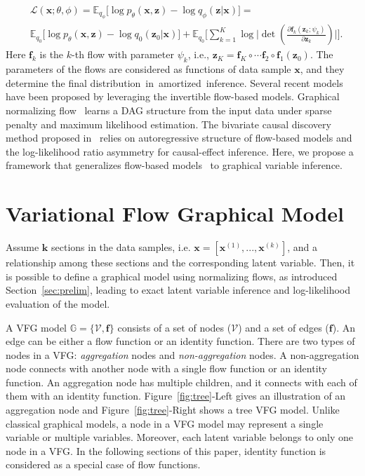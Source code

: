 \documentclass[sigconf, anonymous, review]{acmart}
\theoremstyle{plain}
\theoremstyle{definition}
\theoremstyle{remark}
\begin{document}
\begin{align*}%
&\mathcal{L}(\mathbf{x}; \theta, \phi)  =  \mathbb{E}_{q_{\phi}} \big[\log p_{\theta}(\mathbf{x},\mathbf{z})-\log q_{\phi}(\mathbf{z}|\mathbf{x}) \big] = \\ & \mathbb{E}_{q_{0}} \big[\log p_{\theta}(\mathbf{x},\mathbf{z}) - \log q_{0}(\mathbf{z}_0|\mathbf{x}) \big] + \mathbb{E}_{q_{0}} \big[\sum_{k=1}^K \log\big|\det(\frac{\partial \mathbf{f}_k( \mathbf{z}_k; \psi_k)}{\partial \mathbf{z}_k}) \big| \big].
\end{align*}%
Here $\mathbf{f}_k$ is the $k$-th flow with parameter $\psi_k$, i.e., $\mathbf{z}_K = \mathbf{f}_K \circ \cdots  \mathbf{f}_2 \circ  \mathbf{f}_1(\mathbf{z}_0)$. The parameters of the flows are considered as functions of data sample $\mathbf{x}$, and they determine the final distribution~in~amortized~inference.
Several recent models have been proposed by leveraging the invertible  flow-based models. Graphical normalizing flow~\cite{wehenkel2021graphical}  learns a DAG structure from the input data under  sparse penalty and maximum likelihood estimation. 
The bivariate causal discovery method proposed in~\cite{khemakhem2021causal} relies on  autoregressive structure of flow-based models and the  log-likelihood ratio asymmetry for causal-effect inference. Here, we propose a framework that generalizes flow-based models~\cite{Dinh2016DensityEU, dinh2014nice,rezende2015variational,berg2018sylvester} to graphical variable inference.


\section{Variational Flow Graphical Model}\label{sec:tech}

Assume $\mathbf{k}$ sections in the data samples, i.e. $\mathbf{x} = [\mathbf{x}^{(1)}, ..., \mathbf{x}^{(k)}]$, and  a relationship among these sections and the corresponding  latent variable.
Then, it is possible to define a graphical model using normalizing flows, as introduced Section~\ref{sec:prelim}, leading to exact latent variable inference and log-likelihood evaluation of the model. 


A VFG model  $\mathbb{G}=\{\mathcal{V}, \mathbf{f}\} $ consists of a set of nodes ($\mathcal{V}$) and a set of edges ($\mathbf{f}$). An edge can be either a flow function or an identity function. There are two types of nodes in a VFG: \emph{aggregation} nodes and \emph{non-aggregation} nodes. 
A non-aggregation node connects with another node with a single flow function or an identity function. An aggregation node has multiple children, and it  connects with each of  them with an identity function. Figure~\ref{fig:tree}-Left gives an illustration of an aggregation node and  Figure~\ref{fig:tree}-Right shows a tree VFG model.
Unlike classical graphical models, a node in a VFG model may represent   a single variable or multiple variables. Moreover, each latent variable belongs to only one node in a VFG. In the following sections of this paper, identity function is considered as a special case of flow functions.
\end{document}
